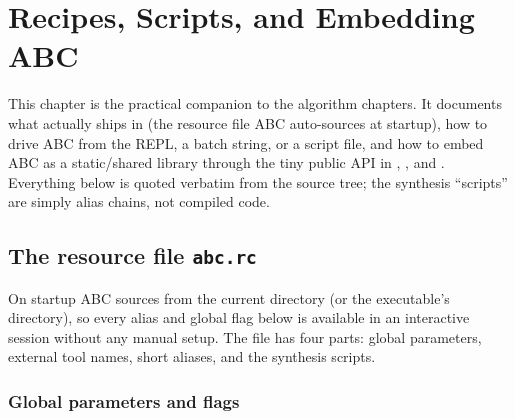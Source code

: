 \chapter{Recipes, Scripts, and Embedding ABC}
\label{ch:recipes}

This chapter is the practical companion to the algorithm chapters. It documents
what actually ships in  (the resource file ABC auto-sources at
startup), how to drive ABC from the REPL, a batch string, or a script file, and
how to embed ABC as a static/shared library through the tiny public API in
, , and
. Everything below is quoted verbatim from the source
tree; the synthesis ``scripts'' are simply alias chains, not compiled code.


\section{The resource file \texttt{abc.rc}}

On startup ABC sources  from the current directory (or the
executable's directory), so every alias and global flag below is available in an
interactive session without any manual setup. The file has four parts: global
parameters, external tool names, short aliases, and the synthesis scripts.

\subsection{Global parameters and flags}

